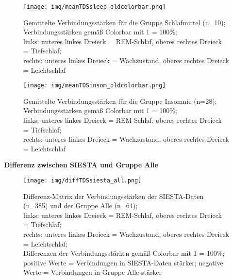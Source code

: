 \begin{figure}[H]
	\centering
	\texttt{[image: img/meanTDSsleep\_oldcolorbar.png]}
	\caption[Verbindungsstärken für die Gruppe Schlafmittel]{Gemittelte Verbindungsstärken für die Gruppe Schlafmittel (n=10);\\Verbindungsstärken gemäß Colorbar mit 1 = 100\%;\\links: unteres linkes Dreieck = \acs{REM}-Schlaf, oberes rechtes Dreieck = Tiefschlaf;\\rechts: unteres linkes Dreieck = Wachzustand, oberes rechtes Dreieck = Leichtschlaf}
	\label{fig:meanTDSsleep}
\end{figure}

\begin{figure}[H]
	\centering
	\texttt{[image: img/meanTDSinsom\_oldcolorbar.png]}
	\caption[Verbindungsstärken für die Gruppe Insomnie]{Gemittelte Verbindungsstärken für die Gruppe Insomnie (n=28);\\Verbindungsstärken gemäß Colorbar mit 1 = 100\%;\\links: unteres linkes Dreieck = \acs{REM}-Schlaf, oberes rechtes Dreieck = Tiefschlaf;\\rechts: unteres linkes Dreieck = Wachzustand, oberes rechtes Dreieck = Leichtschlaf}
	\label{fig:meanTDSinsom}
\end{figure}



\textbf{Differenz zwischen SIESTA und Gruppe Alle}

\begin{figure}[H]
	\centering
	\texttt{[image: img/diffTDSsiesta\_all.png]}
	\caption[Differenz-Matrix der Verbindungsstärken der SIESTA-Daten und der Gruppe Alle]{Differenz-Matrix der Verbindungsstärken der SIESTA-Daten (n=385) und der Gruppe Alle (n=64);\\links: unteres linkes Dreieck = \acs{REM}-Schlaf, oberes rechtes Dreieck = Tiefschlaf;\\rechts: unteres linkes Dreieck = Wachzustand, oberes rechtes Dreieck = Leichtschlaf;\\Differenzen der Verbindungsstärken gemäß Colorbar mit 1 = 100\%;\\positive Werte = Verbindungen in SIESTA-Daten stärker; negative Werte = Verbindungen in Gruppe Alle stärker}
	\label{fig:diffTDSsiesta_all}
\end{figure}



